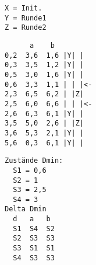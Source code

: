 \documentclass[11pt,
			a4paper,
			parskip=full,
			toc=bib,
			toc=idx,
			toc=listof,
			ngerman
			listof=totoc,]{scrartcl}
\newenvironment{expl}%
{\color{red}}
{\color{black}}
\begin{document}
\begin{expl}
\begin{minipage}[t]{1\linewidth}
\begin{minipage}[t]{0.2\linewidth}
\begin{verbatim}
X = Init.
Y = Runde1
Z = Runde2
    \end{verbatim}
  \end{minipage}
  \begin{minipage}[t]{0.4\linewidth}
    \begin{verbatim}
      a    b   
0,2  3,6  1,6 |Y| |
0,3  3,5  1,2 |Y| |
0,5  3,0  1,6 |Y| |
0,6  3,3  1,1 | | |<- 
2,3  6,5  6,2 | |Z|
2,5  6,0  6,6 | | |<-
2,6  6,3  6,1 |Y| |
3,5  5,0  2,6 | |Z|
3,6  5,3  2,1 |Y| |
5,6  0,3  6,1 |Y| |
    \end{verbatim}
  \end{minipage}
  \begin{minipage}[t]{0.4\linewidth}
    \begin{verbatim}
Zustände Dmin:
  S1 = 0,6
  S2 = 1
  S3 = 2,5
  S4 = 3
Delta Dmin
  d   a   b
  S1  S4  S2
  S2  S3  S3
  S3  S1  S1
  S4  S3  S3
    \end{verbatim}
  \end{minipage}
\end{minipage}
\end{expl}




\end{document}
